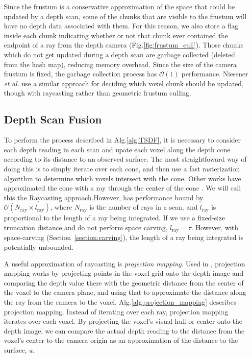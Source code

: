 \documentclass[conference]{IEEEtran}
\newcommand{\sref}[1]{Section~\ref{#1}}
\newcommand{\figref}[1]{Fig.\ref{#1}}
\newcommand{\algoref}[1]{Alg.\ref{#1}}
\newcommand{\etal}{\textit{et al.}}
\begin{document}
Since the frustum is a conservative approximation of the space that could be
updated by a depth scan, some of the chunks that are visible to the frustum will
have no depth data associated with them. For this reason, we also store a flag
inside each chunk indicating whether or not that chunk ever contained the
endpoint of a ray from the depth camera (\figref{fig:frustum_cull}). Those
chunks which do not get updated during a depth scan are garbage collected
(deleted from the hash map), reducing memory overhead. Since the size of the
camera frustum is fixed, the garbage collection process has $\mathcal{O}(1)$
performance. Niessner \etal \cite{NiessnerHashing} use a similar approach for
deciding which voxel chunk should be updated, though with raycasting rather than
geometric frustum culling.

\subsection{Depth Scan Fusion}
\label{section:scan_integration}
To perform the process described in \algoref{alg:TSDF}, it is necessary
to consider each depth reading in each scan and upate each
voxel along the depth cone according to its distance to an observed surface. The
most straightfoward way of doing this is to simply iterate over each cone, and
then use a fast rasterization algorithm \cite{RayTracing} to determine which voxels
intersect with the cone. Other works have approximated the cone with a ray
through the center of the cone \cite{Newcombe, NiessnerHashing}. We will call
this the Raycasting approach.However, has performance bound by
$\mathcal{O}(N_{\text{ray}} \times l_{\text{ray}})$, where $N_{\text{ray}}$ is
the number of rays in a scan, and $l_{\text{ray}}$  is proportional to the
length of a ray being integrated. If we use a fixed-size truncation distance
and do not perform space carving, $l_{\text{ray}} = \tau$.
However, with space-carving (\sref{section:carving}), the length of a ray
being integrated is potentially unbounded.

A useful approximation of raycasting is \textit{projection mapping}. Used in
\cite{Newcombe,Nguyen2012, Bylow2013, Klingensmith2014}, projection mapping
works by projecting points in the voxel grid onto the depth image and comparing the depth value
there with the geometric distance from the center of the voxel to the camera
plane, and using that to approximate the distance along the ray from the camera
to the voxel. \algoref{alg:projection_mapping} describes projection mapping.
Instead of iterating over each ray, projection mapping iterates over each voxel.
By projecting the voxel's visual hull or center onto the depth image, we can
compare the actual depth reading to the distance from the voxel's center to the camera origin as an approximation of the
distance to the surface, $u$. 
\end{document}
